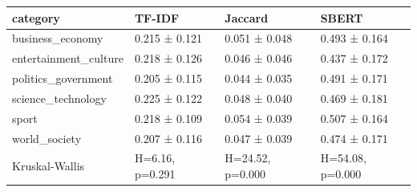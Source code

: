 \begin{tabular}{llll}
\toprule
category & TF-IDF & Jaccard & SBERT \\
\midrule
business\_economy & 0.215 ± 0.121 & 0.051 ± 0.048 & 0.493 ± 0.164 \\
entertainment\_culture & 0.218 ± 0.126 & 0.046 ± 0.046 & 0.437 ± 0.172 \\
politics\_government & 0.205 ± 0.115 & 0.044 ± 0.035 & 0.491 ± 0.171 \\
science\_technology & 0.225 ± 0.122 & 0.048 ± 0.040 & 0.469 ± 0.181 \\
sport & 0.218 ± 0.109 & 0.054 ± 0.039 & 0.507 ± 0.164 \\
world\_society & 0.207 ± 0.116 & 0.047 ± 0.039 & 0.474 ± 0.171 \\
Kruskal-Wallis & H=6.16, p=0.291 & H=24.52, p=0.000 & H=54.08, p=0.000 \\
\bottomrule
\end{tabular}
